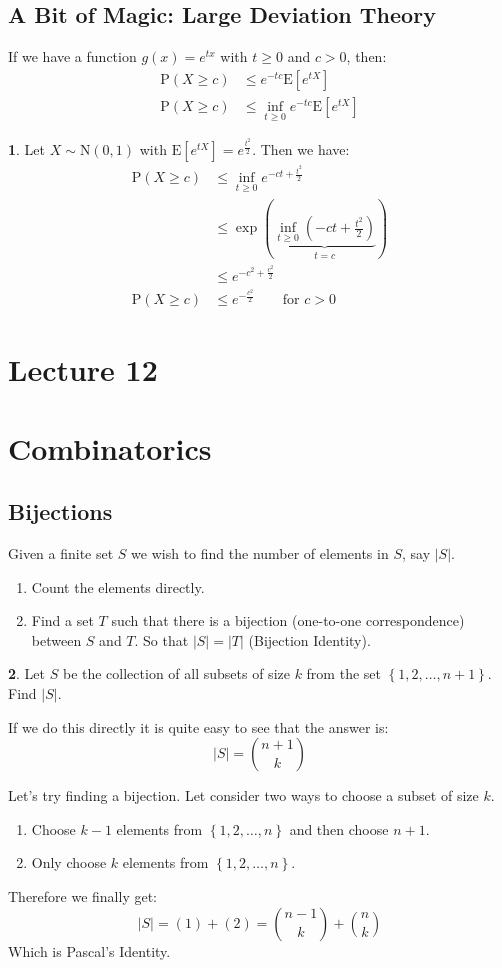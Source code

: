 \documentclass[english,12pt]{article}
\theoremstyle{plain}
\theoremstyle{definition}
\newtheorem*{example}{\protect\examplename}
\theoremstyle{definition} %
\newcommand{\eg}[1]{\begin{example} #1 \end{example} }
\providecommand{\examplename}{Example}
\newcommand{\enum}[1]{\begin{enumerate} #1 \end{enumerate}}
\newcommand{\brac}[1]{\left(#1\right)} %
\newcommand{\curlybrac}[1]{\left\{#1\right\}} %
\newcommand{\ex}[1]{\mbox{E} \left[ #1 \right]}
\begin{document}
\subsection{A Bit of Magic: Large Deviation Theory}
If we have a function $g(x)=e^{tx}$ with $t\ge 0$ and $c>0$, then:
\begin{align*}
\text{P}(X\ge c)&\le e^{-tc}\ex{e^{tX}}\\
\text{P}(X\ge c)&\le\inf\limits_{t\ge 0}e^{-tc}\ex{e^{tX}}
\end{align*}

\eg{
Let $X\sim\text{N}(0,1)$ with $\ex{e^{tX}}=e^{\frac{t^2}{2}}$.  Then we have:
\begin{align*}
\text{P}(X\ge c)&\le\inf\limits_{t\ge 0}e^{-ct+\frac{t^2}{2}}\\
&\le \exp\brac{\underbrace{\inf\limits_{t\ge 0}\brac{-ct+\frac{t^2}{2}}}_{t=c}}\\
&\le e^{-c^2+\frac{c^2}{2}}\\
\text{P}(X\ge c)&\le e^{-\frac{c^2}{2}} \qquad \text{for } c>0
\end{align*}
}

\section*{Lecture 12}
\section{Combinatorics}
\subsection{Bijections}
Given a finite set $S$ we wish to find the number of elements in $S$, say $|S|$.
\enum{
\item Count the elements directly.
\item Find a set $T$ such that there is a bijection (one-to-one correspondence) between $S$ and $T$.  So that $|S|=|T|$ (Bijection Identity).
}

\eg{
Let $S$ be the collection of all subsets of size $k$ from the set $\curlybrac{1,2,\ldots,n+1}$.  Find $|S|$.

If we do this directly it is quite easy to see that the answer is:
\[|S|={n+1\choose k}\]

Let's try finding a bijection.  Let consider two ways to choose a subset of size $k$.
\enum{
\item Choose $k-1$ elements from $\curlybrac{1,2,\ldots,n}$ and then choose $n+1$.
\item Only choose $k$ elements from $\curlybrac{1,2,\ldots,n}$.
}
Therefore we finally get:
\[|S|=(1)+(2)={n-1\choose k}+{n\choose k}\]
Which is Pascal's Identity.
}
\end{document}

